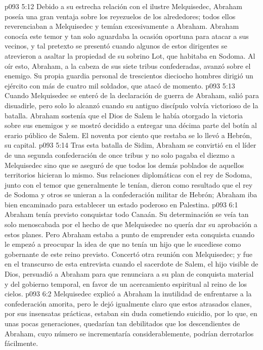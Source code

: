 \vs p093 5:12 Debido a su estrecha relación con el ilustre Melquisedec, Abraham poseía una gran ventaja sobre los reyezuelos de los alrededores; todos ellos reverenciaban a Melquisedec y temían excesivamente a Abraham. Abraham conocía este temor y tan solo aguardaba la ocasión oportuna para atacar a sus vecinos, y tal pretexto se presentó cuando algunos de estos dirigentes se atrevieron a asaltar la propiedad de su sobrino Lot, que habitaba en Sodoma. Al oír esto, Abraham, a la cabeza de sus siete tribus confederadas, avanzó sobre el enemigo. Su propia guardia personal de trescientos dieciocho hombres dirigió un ejército con más de cuatro mil soldados, que atacó de momento.
\vs p093 5:13 Cuando Melquisedec se enteró de la declaración de guerra de Abraham, salió para disuadirle, pero solo lo alcanzó cuando su antiguo discípulo volvía victorioso de la batalla. Abraham sostenía que el Dios de Salem le había otorgado la victoria sobre sus enemigos y se mostró decidido a entregar una décima parte del botín al erario público de Salem. El noventa por ciento que restaba se lo llevó a Hebrón, su capital.
\vs p093 5:14 Tras esta batalla de Sidim, Abraham se convirtió en el líder de una segunda confederación de once tribus y no solo pagaba el diezmo a Melquisedec sino que se aseguró de que todos los demás poblados de aquellos territorios hicieran lo mismo. Sus relaciones diplomáticas con el rey de Sodoma, junto con el temor que generalmente le tenían, dieron como resultado que el rey de Sodoma y otros se unieran a la confederación militar de Hebrón; Abraham iba bien encaminado para establecer un estado poderoso en Palestina.
\vs p093 6:1 Abraham tenía previsto conquistar todo Canaán. Su determinación se veía tan solo menoscabada por el hecho de que Melquisedec no quería dar su aprobación a estos planes. Pero Abraham estaba a punto de emprender esta conquista cuando le empezó a preocupar la idea de que no tenía un hijo que le sucediese como gobernante de este reino previsto. Concertó otra reunión con Melquisedec; y fue en el transcurso de esta entrevista cuando el sacerdote de Salem, el hijo visible de Dios, persuadió a Abraham para que renunciara a su plan de conquista material y del gobierno temporal, en favor de un acercamiento espiritual al reino de los cielos.
\vs p093 6:2 Melquisedec explicó a Abraham la inutilidad de enfrentarse a la confederación amorita, pero le dejó igualmente claro que estos atrasados clanes, por sus insensatas prácticas, estaban sin duda cometiendo suicidio, por lo que, en unas pocas generaciones, quedarían tan debilitados que los descendientes de Abraham, cuyo número se incrementaría considerablemente, podrían derrotarlos fácilmente.
